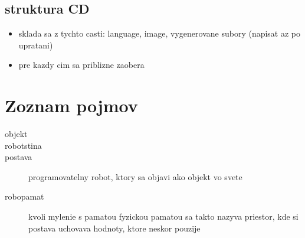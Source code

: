 \documentclass[12pt,notitlepage]{report}
\begin{document}
\section{struktura CD}
\begin{itemize}
\item sklada sa z tychto casti: language, image, vygenerovane subory (napisat az po upratani)
\item pre kazdy cim sa priblizne zaobera
\end{itemize}
\chapter{Zoznam pojmov}
\begin{description}
\item[objekt]
\item[robotstina]
\item[postava]
programovatelny robot, ktory sa objavi ako objekt vo svete
\item[robopamat]
	kvoli mylenie s pamatou fyzickou pamatou sa takto nazyva priestor, kde si postava uchovava hodnoty, ktore neskor pouzije
\end{description}
\end{document}
